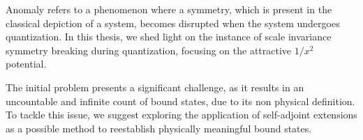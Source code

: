 Anomaly refers to a phenomenon where a symmetry, which is present in the classical depiction of a system, becomes disrupted when the system undergoes quantization. In this thesis, we shed light on the instance of scale invariance symmetry breaking during quantization, focusing on the attractive $1/x^2$ potential.

The initial problem presents a significant challenge, as it results in an uncountable and infinite count of bound states, due to its non physical definition. To tackle this issue, we suggest exploring the application of self-adjoint extensions as a possible method to reestablish physically meaningful bound states.
